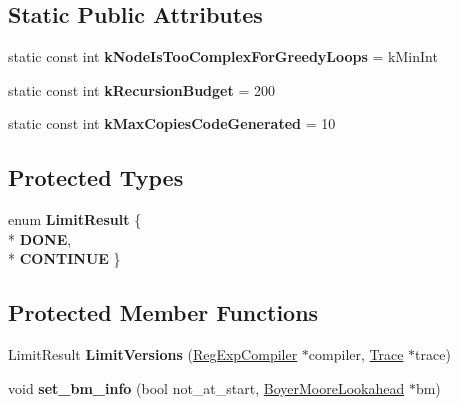 \subsection*{Static Public Attributes}
\begin{DoxyCompactItemize}
\item 
static const int {\bfseries k\+Node\+Is\+Too\+Complex\+For\+Greedy\+Loops} = k\+Min\+Int\hypertarget{classv8_1_1internal_1_1_reg_exp_node_acdf311f0dacb16f281babbdd2ed30a70}{}\label{classv8_1_1internal_1_1_reg_exp_node_acdf311f0dacb16f281babbdd2ed30a70}

\item 
static const int {\bfseries k\+Recursion\+Budget} = 200\hypertarget{classv8_1_1internal_1_1_reg_exp_node_ac77fc160c5ff5db7808583c401c65ede}{}\label{classv8_1_1internal_1_1_reg_exp_node_ac77fc160c5ff5db7808583c401c65ede}

\item 
static const int {\bfseries k\+Max\+Copies\+Code\+Generated} = 10\hypertarget{classv8_1_1internal_1_1_reg_exp_node_aee16545e1cda3652a44891cefb9e60ad}{}\label{classv8_1_1internal_1_1_reg_exp_node_aee16545e1cda3652a44891cefb9e60ad}

\end{DoxyCompactItemize}
\subsection*{Protected Types}
\begin{DoxyCompactItemize}
\item 
enum {\bfseries Limit\+Result} \{ \\*
{\bfseries D\+O\+NE}, 
\\*
{\bfseries C\+O\+N\+T\+I\+N\+UE}
 \}\hypertarget{classv8_1_1internal_1_1_reg_exp_node_a500fa4ebb18d4f45d6ea99e6da33defc}{}\label{classv8_1_1internal_1_1_reg_exp_node_a500fa4ebb18d4f45d6ea99e6da33defc}

\end{DoxyCompactItemize}
\subsection*{Protected Member Functions}
\begin{DoxyCompactItemize}
\item 
Limit\+Result {\bfseries Limit\+Versions} (\hyperlink{classv8_1_1internal_1_1_reg_exp_compiler}{Reg\+Exp\+Compiler} $\ast$compiler, \hyperlink{classv8_1_1internal_1_1_trace}{Trace} $\ast$trace)\hypertarget{classv8_1_1internal_1_1_reg_exp_node_a5b390ba923933075f890a385a6b1b5ee}{}\label{classv8_1_1internal_1_1_reg_exp_node_a5b390ba923933075f890a385a6b1b5ee}

\item 
void {\bfseries set\+\_\+bm\+\_\+info} (bool not\+\_\+at\+\_\+start, \hyperlink{classv8_1_1internal_1_1_boyer_moore_lookahead}{Boyer\+Moore\+Lookahead} $\ast$bm)\hypertarget{classv8_1_1internal_1_1_reg_exp_node_a1d97a915147648cff2a1792e2651547c}{}\label{classv8_1_1internal_1_1_reg_exp_node_a1d97a915147648cff2a1792e2651547c}

\end{DoxyCompactItemize}
